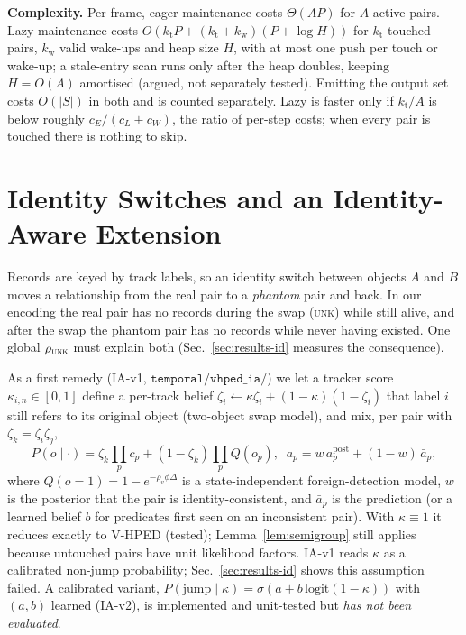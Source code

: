 \documentclass[conference]{IEEEtran}
\newcommand{\UNK}{\textsc{unk}}
\begin{document}
\textbf{Complexity.} Per frame, eager maintenance costs $\Theta(AP)$ for $A$ active pairs.
Lazy maintenance costs $O(k_{\mathrm{t}}P+(k_{\mathrm{t}}+k_{\mathrm{w}})(P+\log H))$ for
$k_{\mathrm{t}}$ touched pairs, $k_{\mathrm{w}}$ valid wake-ups and heap size $H$, with at
most one push per touch or wake-up; a stale-entry scan runs only after the heap doubles,
keeping $H=O(A)$ amortised (argued, not separately tested). Emitting the output set costs
$O(|S|)$ in both and is counted separately. Lazy is faster only if
$k_{\mathrm t}/A$ is below roughly $c_E/(c_L+c_W)$, the ratio of per-step costs; when
every pair is touched there is nothing to skip.

\section{Identity Switches and an Identity-Aware Extension}
Records are keyed by track labels, so an identity switch between objects $A$ and $B$
moves a relationship from the real pair to a \emph{phantom} pair and back. In our
encoding the real pair has no records during the swap (\UNK) while still alive, and
after the swap the phantom pair has no records while never having existed. One global
$\rho_{\UNK}$ must explain both (Sec.~\ref{sec:results-id} measures the consequence).

As a first remedy (IA-v1, $\texttt{temporal/vhped\_ia/}$) we let a tracker score
$\kappa_{i,n}\in[0,1]$ define a per-track belief
$\zeta_i\leftarrow\kappa\zeta_i+(1-\kappa)(1-\zeta_i)$ that label $i$ still refers to its
original object (two-object swap model), and mix, per pair with
$\zeta_k=\zeta_i\zeta_j$,
\begin{equation}
P(o\mid\cdot)=\zeta_k\prod_p c_p+(1-\zeta_k)\prod_p Q(o_p),\;\;
a_p=w\,a_p^{\mathrm{post}}+(1-w)\,\bar a_p,
\label{eq:ia}
\end{equation}
where $Q(o{=}1)=1-e^{-\rho_v\phi\Delta}$ is a state-independent foreign-detection
model, $w$ is the posterior that the pair is identity-consistent, and $\bar a_p$ is the
prediction (or a learned belief $b$ for predicates first seen on an inconsistent pair).
With $\kappa\equiv1$ it reduces exactly to V-HPED (tested); Lemma~\ref{lem:semigroup}
still applies because untouched pairs have unit likelihood factors. IA-v1 reads $\kappa$
as a calibrated non-jump probability; Sec.~\ref{sec:results-id} shows this assumption
failed. A calibrated variant, $P(\text{jump}\mid\kappa)=\sigma(a+b\,\mathrm{logit}(1-\kappa))$
with $(a,b)$ learned (IA-v2), is implemented and unit-tested but \emph{has not been
evaluated}.
\end{document}
